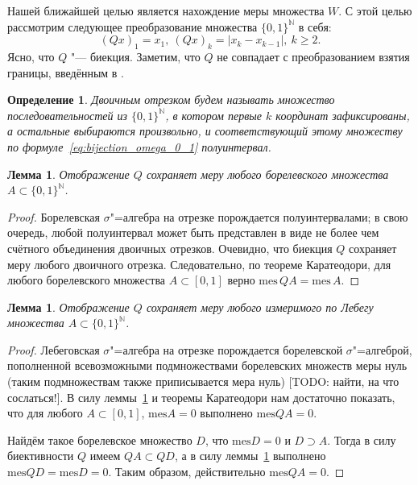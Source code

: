 \documentclass[12pt]{article}
\newtheorem{lem}[thm]{Лемма}
\newtheorem{dfn}[thm]{Определение}
\def\N{{\mathbb{N}}}
\def\mes{{\mathrm{mes}}}
\begin{document}
Нашей ближайшей целью является нахождение меры множества $W$. С этой целью рассмотрим следующее преобразование множества $\{0,1\}^\N$ в себя:
$$(Qx)_1=x_1, \ (Qx)_k=|x_k-x_{k-1}|, \ k\ge2.$$
Ясно, что $Q$ "--- биекция.
Заметим, что $Q$ не совпадает с преобразованием взятия границы, введённым в \cite{keller1992invariant}.

\begin{dfn}
	Двоичным отрезком будем называть множество последовательностей из $\{0,1\}^\N$,
	в котором первые $k$ координат зафиксированы, а остальные выбираются произвольно,
	и соответствующий этому множеству по формуле~\eqref{eq:bijection_omega_0_1} полуинтервал.
\end{dfn}



\begin{lem}\label{lem:Q_Borel}
	Отображение $Q$ сохраняет меру любого борелевского множества $A\subset \{0,1\}^\N$.
\end{lem}

\begin{proof}
	Борелевская $\sigma$"=алгебра на отрезке порождается полуинтервалами;
	в свою очередь, любой полуинтервал может быть представлен в виде не более чем счётного объединения двоичных отрезков.
	Очевидно, что биекция $Q$ сохраняет меру любого двоичного отрезка.
	Следовательно, по теореме Каратеодори, для любого борелевского множества $A\subset [0,1]$ верно
	$\mes \, QA = \mes \, A$.
\end{proof}

\begin{lem}\label{lem:Q_Lebesgue}
	Отображение $Q$ сохраняет меру любого измеримого по Лебегу множества $A\subset \{0,1\}^\N$.
\end{lem}

\begin{proof}
	Лебеговская $\sigma$"=алгебра на отрезке порождается борелевской $\sigma$"=алгеброй,
	пополненной всевозможными подмножествами борелевских множеств меры нуль
	(таким подмножествам также приписывается мера нуль)
	[TODO: найти, на что сослаться!].
	В силу леммы~\ref{lem:Q_Borel} и теоремы Каратеодори нам достаточно показать,
	что для любого $A\subset[0,1]$, $\mes A = 0$ выполнено $\mes QA = 0$.

	Найдём такое борелевское множество $D$, что $\mes D = 0$ и $D\supset A$.
	Тогда в силу биективности $Q$ имеем $QA \subset QD$, а в силу леммы~\ref{lem:Q_Borel} выполнено $\mes QD = \mes D = 0$.
	Таким образом, действительно $\mes QA = 0$.
\end{proof}
\end{document}
